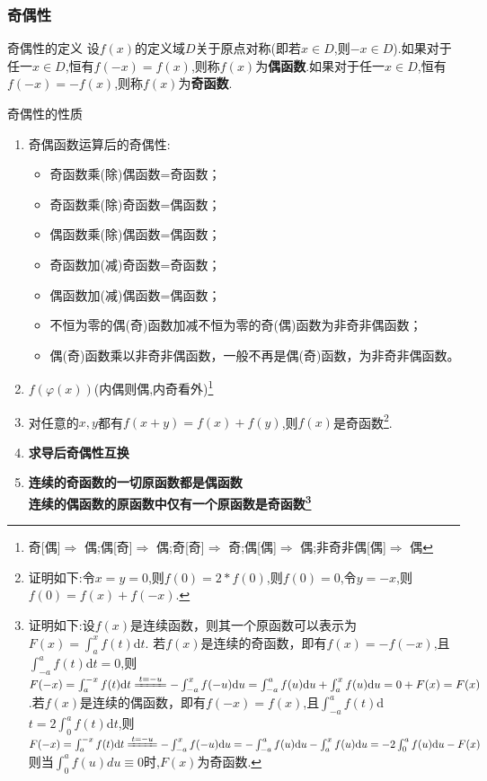 \documentclass[8pt a4paper, oneside, UTF8]{ctexbook}  %
\begin{document}
\begin{sloppypar}
    \subsubsection{奇偶性}
    \begin{defn}{奇偶性的定义}{}
        设$f(x)$的定义域$D$关于原点对称(即若$x \in D$,则$-x \in D$).如果对于任一$x \in D$,恒有$f(-x)=f(x)$,则称$f(x)$为\textbf{偶函数}.如果对于任一$x \in D$,恒有$f(-x)=-f(x)$,则称$f(x)$为\textbf{奇函数}.
    \end{defn}
    \begin{criterion}{奇偶性的性质}{}\label{jox2}
        \begin{enumerate}
            \item 奇偶函数运算后的奇偶性:
                  \begin{itemize}
                      \item 奇函数乘(除)偶函数=奇函数；
                      \item 奇函数乘(除)奇函数=偶函数；
                      \item 偶函数乘(除)偶函数=偶函数；
                      \item 奇函数加(减)奇函数=奇函数；
                      \item 偶函数加(减)偶函数=偶函数；
                      \item 不恒为零的偶(奇)函数加减不恒为零的奇(偶)函数为非奇非偶函数；
                      \item 偶(奇)函数乘以非奇非偶函数，一般不再是偶(奇)函数，为非奇非偶函数。
                  \end{itemize}
            \item $f(\varphi(x))$(内偶则偶,内奇看外)\footnote{
                  奇[偶]$\Rightarrow$ 偶;偶[奇]$\Rightarrow$ 偶;奇[奇]$\Rightarrow$ 奇;偶[偶]$\Rightarrow$ 偶;非奇非偶[偶]$\Rightarrow$ 偶}
            \item 对任意的$x,y$都有$f(x+y)=f(x)+f(y)$,则$f(x)$是奇函数\footnote{证明如下:令$x=y=0$,则$f(0)=2*f(0)$,则$f(0)=0$,令$y=-x$,则$f(0)=f(x)+f(-x).$}.
            \item \textbf{求导后奇偶性互换}
            \item \textbf{连续的奇函数的一切原函数都是偶函数}\\\textbf{连续的偶函数的原函数中仅有一个原函数是奇函数\footnote{证明如下:设$f(x)$是连续函数，则其一个原函数可以表示为$F( x) = \int _a^xf( t) $d$t.$ 若$f(x)$是连续的奇函数，即有$f(x)=-f(-x)$,且$\int _{- a}^af( t) $d$t= 0$,则$F(-x)=\int_a^{-x} f(t) \mathrm{d} t \xlongequal{t=-u}-\int_{-a}^x f(-u) \mathrm{d} u=\int_{-a}^a f(u) \mathrm{d} u+\int_a^x f(u) \mathrm{d} u=0+F(x)=F(x)$.若$f(x)$是连续的偶函数，即有$f(-x)=f(x)$,且$\int _{- a}^af( t) $d$t= 2\int _0^af( t) $d$t$,则$F(-x)=\int_a^{-x} f(t) \mathrm{d} t \xlongequal{t=-u}-\int_{-a}^x f(-u) \mathrm{d} u=-\int_{-a}^a f(u) \mathrm{d} u-\int_a^x f(u) \mathrm{d} u=-2 \int_0^a f(u) \mathrm{d} u-F(x)$则当$\int _0 ^a f(u)du \equiv 0$时,$F(x)$为奇函数.}}\label{jox1}

\end{enumerate}
\end{criterion}
\end{sloppypar}
\end{document}
